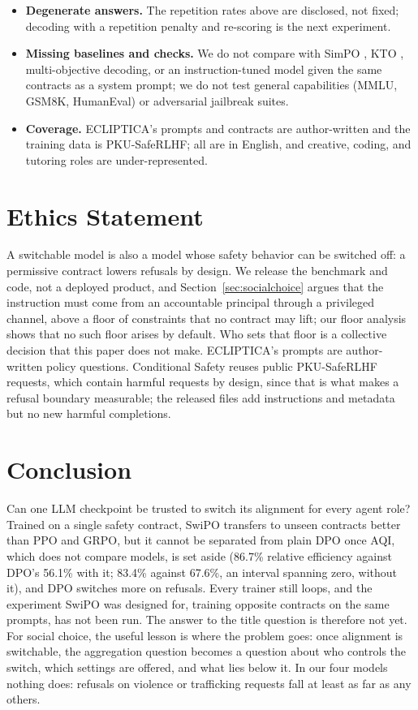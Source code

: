 \documentclass[letterpaper]{article} %
\begin{document}
\begin{itemize}
    \item \textbf{Degenerate answers.} The repetition rates above are disclosed, not fixed; decoding with a repetition penalty and re-scoring is the next experiment.
    \item \textbf{Missing baselines and checks.} We do not compare with SimPO \cite{meng2024simpo}, KTO \cite{ethayarajh2024kto}, multi-objective decoding, or an instruction-tuned model given the same contracts as a system prompt; we do not test general capabilities (MMLU, GSM8K, HumanEval) or adversarial jailbreak suites.
    \item \textbf{Coverage.} ECLIPTICA's prompts and contracts are author-written and the training data is PKU-SafeRLHF; all are in English, and creative, coding, and tutoring roles are under-represented.
\end{itemize}

\section{Ethics Statement}

A switchable model is also a model whose safety behavior can be switched off: a permissive contract lowers refusals by design. We release the benchmark and code, not a deployed product, and Section~\ref{sec:socialchoice} argues that the instruction must come from an accountable principal through a privileged channel, above a floor of constraints that no contract may lift; our floor analysis shows that no such floor arises by default. Who sets that floor is a collective decision that this paper does not make. ECLIPTICA's prompts are author-written policy questions. Conditional Safety reuses public PKU-SafeRLHF requests, which contain harmful requests by design, since that is what makes a refusal boundary measurable; the released files add instructions and metadata but no new harmful completions.

\section{Conclusion}

Can one LLM checkpoint be trusted to switch its alignment for every agent role? Trained on a single safety contract, SwiPO transfers to unseen contracts better than PPO and GRPO, but it cannot be separated from plain DPO once AQI, which does not compare models, is set aside (86.7\% relative efficiency against DPO's 56.1\% with it; 83.4\% against 67.6\%, an interval spanning zero, without it), and DPO switches more on refusals. Every trainer still loops, and the experiment SwiPO was designed for, training opposite contracts on the same prompts, has not been run. The answer to the title question is therefore not yet. For social choice, the useful lesson is where the problem goes: once alignment is switchable, the aggregation question becomes a question about who controls the switch, which settings are offered, and what lies below it. In our four models nothing does: refusals on violence or trafficking requests fall at least as far as any others.

{\small

}
\end{document}
